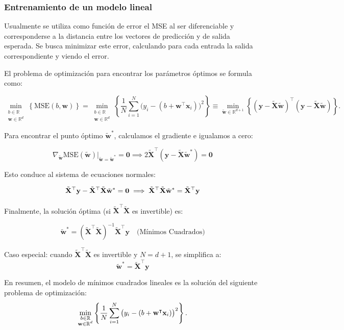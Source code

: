 \subsubsection{Entrenamiento de un modelo lineal}
Usualmente se utiliza como función de error el MSE al ser diferenciable y corresponderse a la distancia entre los vectores de predicción y de salida esperada. Se busca minimizar este error, calculando para cada entrada la salida correspondiente y viendo el error.

El problema de optimización para encontrar los parámetros óptimos se formula como:

$$
\min_{\substack{b \in \mathbb{R} \\ \mathbf{w} \in \mathbb{R}^d}} \left\{ \text{MSE}(b, \mathbf{w}) \right\} = \min_{\substack{b \in \mathbb{R} \\ \mathbf{w} \in \mathbb{R}^d}} \left\{ \frac{1}{N} \sum_{i=1}^{N} \big(y_i - (b + \mathbf{w}^\intercal\mathbf{x}_i)\big)^2 \right\} \equiv \min_{\tilde{\mathbf{w}} \in \mathbb{R}^{d+1}} \left\{ (\mathbf{y} - \tilde{\mathbf{X}}\tilde{\mathbf{w}})^\top (\mathbf{y} - \tilde{\mathbf{X}}\tilde{\mathbf{w}}) \right\}.
$$

Para encontrar el punto óptimo $\tilde{\mathbf{w}}^*$, calculamos el gradiente e igualamos a cero:

$$\nabla_{\tilde{\mathbf{w}}} \text{MSE}(\tilde{\mathbf{w}})\big|_{\tilde{\mathbf{w}}=\tilde{\mathbf{w}}^*} = \mathbf{0} \implies 2\tilde{\mathbf{X}}^\top(\mathbf{y} - \tilde{\mathbf{X}}\tilde{\mathbf{w}}^*) = \mathbf{0}
$$

Esto conduce al sistema de ecuaciones normales:

$$\tilde{\mathbf{X}}^\top \mathbf{y} - \tilde{\mathbf{X}}^\top \tilde{\mathbf{X}}\tilde{\mathbf{w}}^* = \mathbf{0} \\
\implies \tilde{\mathbf{X}}^\top \tilde{\mathbf{X}}\tilde{\mathbf{w}}^* = \tilde{\mathbf{X}}^\top \mathbf{y}
$$

Finalmente, la solución óptima (si $\tilde{\mathbf{X}}^\top \tilde{\mathbf{X}}$ es invertible) es:

$$
\tilde{\mathbf{w}}^* = (\tilde{\mathbf{X}}^\top \tilde{\mathbf{X}})^{-1} \tilde{\mathbf{X}}^\top \mathbf{y} \quad \text{(Mínimos Cuadrados)}
$$

Caso especial: cuando $\tilde{\mathbf{X}}^\top \tilde{\mathbf{X}}$ es invertible y $N = d+1$, se simplifica a:
$$
\tilde{\mathbf{w}}^* = \tilde{\mathbf{X}}^\top \mathbf{y}
$$

En resumen, el modelo de mínimos cuadrados lineales es la solución del siguiente problema de optimización:
$$
\min_{\begin{subarray}{c} 
    b \in \mathbb{R} \\
    \mathbf{w} \in \mathbb{R}^d 
\end{subarray}} \left\{ 
    \frac{1}{N} \sum_{i=1}^{N} \big(y_i - (b + \mathbf{w}^{\intercal} \mathbf{x}_i)\big)^2 
\right\}.
$$

